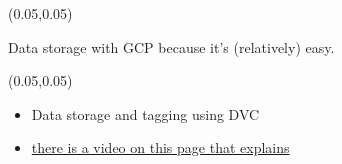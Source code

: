 \documentclass[aspectratio=169]{beamer} %
\begin{document}
\begin{frame}{}
    \setlength{\TPHorizModule}{\textwidth}
    \setlength{\TPVertModule}{\textwidth}
    \begin{textblock}{0.74}(0.05,0.05)
        \bfseries\large\textcolor{white}{Data Storage - Google Cloud}
    \end{textblock}

Data storage with GCP because it's (relatively) easy.
\end{frame}



\begin{frame}{}
    \setlength{\TPHorizModule}{\textwidth}
    \setlength{\TPVertModule}{\textwidth}
    \begin{textblock}{0.74}(0.05,0.05)
        \bfseries\large\textcolor{white}{Data Storage - DVC}
    \end{textblock}
    \begin{itemize}
    \item Data storage and tagging using DVC
    \item \href{https://dvc.org/}{there is a video on this page that explains}
    \end{itemize}
\end{frame}
\end{document}

